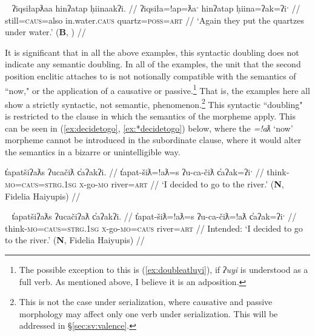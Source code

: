 
\begin{comment}
\ex~ \label{ex:doubleatgeneric}
\begingl
\glpreamble ʔayaqḥʔatna huḥtak̓at. //
\gla ʔaya-(q)ḥ=!at=naˑ huḥtak=!at  //
\glb many-\textsc{link}=\textsc{pass}=\textsc{neut.1pl} learn=\textsc{pass} //
\glft `Many know.' (\textbf{B}, Sarah Webster) //
\endgl
\xe
\end{comment}


\ex~ \label{ex:doubleap}
\begingl
\glpreamble ʔiqsiłapƛaa hinʔatap ḥiinaakʔi. //
\gla ʔiqsiła=!ap=ƛaˑ hinʔatap ḥiina=ʔak=ʔiˑ  //
\glb still=\textsc{caus}=also in.water.\textsc{caus} quartz=\textsc{poss}=\textsc{art} //
\glft `Again they put the quartzes under water.' (\textbf{B}, \citealt[60]{sapir1955}) //
\endgl
\xe

It is significant that in all the above examples, this syntactic doubling does not indicate any semantic doubling. In all of the examples, the unit that the second position enclitic attaches to is not notionally compatible with the semantics of ``now," or the application of a causative or passive.\footnote{The possible exception to this is (\ref{ex:doubleatluyi}), if \textit{ʔuyi} is understood as a full verb. As mentioned above, I believe it is an adposition.} That is, the examples here all show a strictly syntactic, not semantic, phenomenon.\footnote{This is not the case under serialization, where causative and passive morphology may affect only one verb under serialization. This will be addressed in \S\ref{sec:sv:valence}.} This syntactic ``doubling" is restricted to the clause in which the semantics of the morpheme apply. This can be seen in (\ref{ex:decidetogo}, \ref{ex:*decidetogo}) below, where the \textit{=!aƛ} `now' morpheme cannot be introduced in the subordinate clause, where it would alter the semantics in a bizarre or unintelligible way.

\ex \label{ex:decidetogo}
\begingl
\glpreamble t̓apatšiʔaƛs ʔucačiƛ c̓aʔakʔi. //
\gla t̓apat-šiƛ=!aƛ=s ʔu-ca-čiƛ c̓aʔak=ʔiˑ //
\glb think-\textsc{mo}=\textsc{caus}=\textsc{strg.1sg} \textsc{x}-go-\textsc{mo} river=\textsc{art} //
\glft `I decided to go to the river.' (\textbf{N}, Fidelia Haiyupis) //
\endgl
\xe

\ex~ \label{ex:*decidetogo}
\begingl
\glpreamble *t̓apatšiʔaƛs ʔucačiʔaƛ c̓aʔakʔi. //
\gla *t̓apat-šiƛ=!aƛ=s ʔu-ca-čiƛ=!aƛ c̓aʔak=ʔiˑ //
\glb think-\textsc{mo}=\textsc{caus}=\textsc{strg.1sg} \textsc{x}-go-\textsc{mo}=\textsc{caus} river=\textsc{art} //
\glft Intended: `I decided to go to the river.' (\textbf{N}, Fidelia Haiyupis) //
\endgl
\xe



